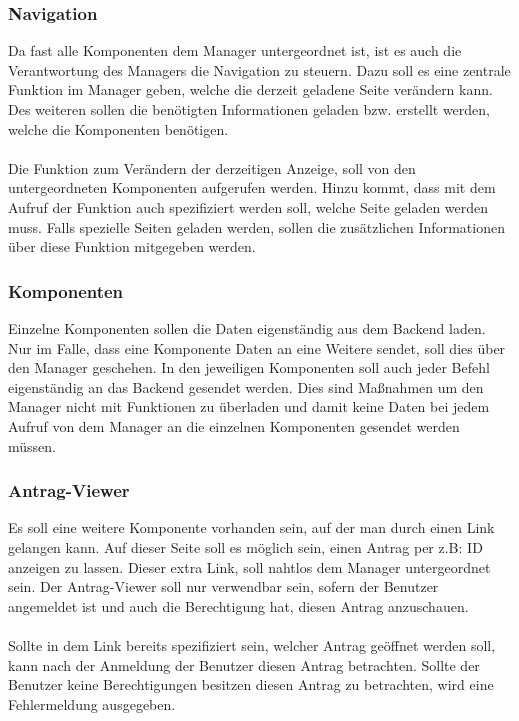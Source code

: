 \subsubsection{Navigation}
Da fast alle Komponenten dem Manager untergeordnet ist, ist es auch die Verantwortung des Managers die Navigation zu steuern. Dazu soll es eine zentrale Funktion im Manager geben, welche die derzeit geladene Seite verändern kann. Des weiteren sollen die benötigten Informationen geladen bzw. erstellt werden, welche die Komponenten benötigen.
\\\\
Die Funktion zum Verändern der derzeitigen Anzeige, soll von den untergeordneten Komponenten aufgerufen werden. Hinzu kommt, dass mit dem Aufruf der Funktion auch spezifiziert werden soll, welche Seite geladen werden muss. Falls spezielle Seiten geladen werden, sollen die zusätzlichen Informationen über diese Funktion mitgegeben werden.

\subsubsection{Komponenten}
Einzelne Komponenten sollen die Daten eigenständig aus dem Backend laden. Nur im Falle, dass eine Komponente Daten an eine Weitere sendet, soll dies über den Manager geschehen. In den jeweiligen Komponenten soll auch jeder Befehl eigenständig an das Backend gesendet werden. Dies sind Maßnahmen um den Manager nicht mit Funktionen zu überladen und damit keine Daten bei jedem Aufruf von dem Manager an die einzelnen Komponenten gesendet werden müssen.

\subsubsection{Antrag-Viewer}
Es soll eine weitere Komponente vorhanden sein, auf der man durch einen Link gelangen kann. Auf dieser Seite soll es möglich sein, einen Antrag per z.B: ID anzeigen zu lassen. Dieser extra Link, soll nahtlos dem Manager untergeordnet sein. Der Antrag-Viewer soll nur verwendbar sein, sofern der Benutzer angemeldet ist und auch die Berechtigung hat, diesen Antrag anzuschauen.
\\\\
Sollte in dem Link bereits spezifiziert sein, welcher Antrag geöffnet werden soll, kann nach der Anmeldung der Benutzer diesen Antrag betrachten. Sollte der Benutzer keine Berechtigungen besitzen diesen Antrag zu betrachten, wird eine Fehlermeldung ausgegeben.

